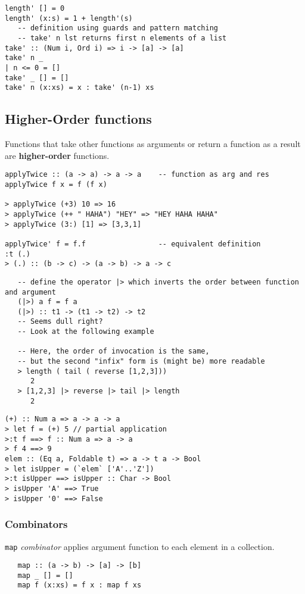 \begin{lstlisting}
length' [] = 0
length' (x:s) = 1 + length'(s)
   -- definition using guards and pattern matching
   -- take' n lst returns first n elements of a list
take' :: (Num i, Ord i) => i -> [a] -> [a]
take' n _
| n <= 0 = []
take' _ [] = []
take' n (x:xs) = x : take' (n-1) xs
\end{lstlisting}

\subsection{Higher-Order functions}
Functions that take other functions as arguments or return a function as a result are \textbf{higher-order} functions.

\begin{lstlisting}
applyTwice :: (a -> a) -> a -> a    -- function as arg and res
applyTwice f x = f (f x)

> applyTwice (+3) 10 => 16
> applyTwice (++ " HAHA") "HEY" => "HEY HAHA HAHA"
> applyTwice (3:) [1] => [3,3,1]

applyTwice' f = f.f                 -- equivalent definition
:t (.)
> (.) :: (b -> c) -> (a -> b) -> a -> c
\end{lstlisting}

\begin{lstlisting}
   -- define the operator |> which inverts the order between function and argument
   (|>) a f = f a
   (|>) :: t1 -> (t1 -> t2) -> t2
   -- Seems dull right?
   -- Look at the following example
   
   -- Here, the order of invocation is the same,
   -- but the second "infix" form is (might be) more readable
   > length ( tail ( reverse [1,2,3])) 
      2
   > [1,2,3] |> reverse |> tail |> length 
      2
\end{lstlisting}

\begin{lstlisting}
(+) :: Num a => a -> a -> a
> let f = (+) 5 // partial application
>:t f ==> f :: Num a => a -> a
> f 4 ==> 9
elem :: (Eq a, Foldable t) => a -> t a -> Bool
> let isUpper = (`elem` ['A'..'Z'])
>:t isUpper ==> isUpper :: Char -> Bool
> isUpper 'A' ==> True
> isUpper '0' ==> False
\end{lstlisting}

\subsubsection{Combinators}
\lstinline|map| \textit{combinator} applies argument function to each element in
a collection.
\begin{lstlisting}
   map :: (a -> b) -> [a] -> [b]
   map _ [] = []
   map f (x:xs) = f x : map f xs
\end{lstlisting}

